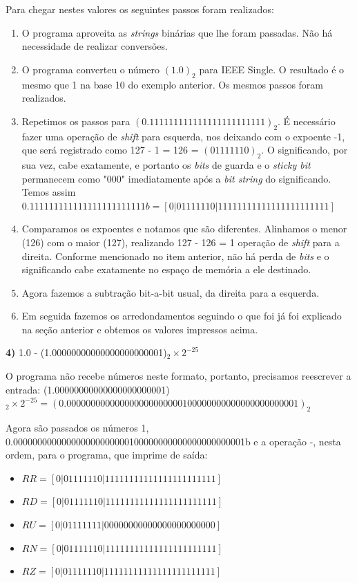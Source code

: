 \documentclass[11pt]{article}
\begin{document}
Para chegar nestes valores os seguintes passos foram realizados:
\begin{enumerate}
  \item O programa aproveita as \textit{strings} binárias que lhe foram passadas. Não há necessidade de realizar conversões.
  \item O programa converteu o número $(1.0)_2$ para IEEE Single. O resultado é o mesmo que 1 na base 10 do exemplo anterior. Os mesmos passos foram realizados.
  \item Repetimos os passos para $(0.111111111111111111111111)_2$. É necessário fazer uma operação de \textit{shift} para esquerda, nos deixando com o expoente -1, que será registrado como 127 - 1 = 126 = $(01111110)_2$.
  O significando, por sua vez, cabe exatamente, e portanto os \textit{bits} de guarda e o \textit{sticky bit} permanecem como "000" imediatamente após a \textit{bit string} do significando. Temos assim
  {\small$0.111111111111111111111111b = [ 0 | 0 1 1 1 1 1 1 0 | 1 1 1 1 1 1 1 1 1 1 1 1 1 1 1 1 1 1 1 1 1 1 1 ] $}
  \item Comparamos os expoentes e notamos que são diferentes. Alinhamos o menor (126) com o maior (127), realizando 127 - 126 = 1 operação de \textit{shift} para a direita. Conforme mencionado no item anterior,
  não há perda de \textit{bits} e o significando cabe exatamente no espaço de memória a ele destinado.
  \item Agora fazemos a subtração bit-a-bit usual, da direita para a esquerda.

  \item Em seguida fazemos os arredondamentos seguindo o que foi já foi explicado na seção anterior e obtemos os valores impressos acima.
\end{enumerate}

\textbf{4)} 1.0 - (1.00000000000000000000001)$_2 \times 2^{-25} $

O programa não recebe números neste formato, portanto, precisamos reescrever a entrada:
(1.00000000000000000000001)$_2 \times 2^{-25} = (0.000000000000000000000000100000000000000000000001)_2 $

Agora são passados os números 1, 0.000000000000000000000000100000000000000000000001b e a operação -, nesta ordem, para o programa, que imprime de saída:

\begin{itemize}
  \item {\small$ RR = [ 0 | 0 1 1 1 1 1 1 0 | 1 1 1 1 1 1 1 1 1 1 1 1 1 1 1 1 1 1 1 1 1 1 1 ] $}
  \item {\small$ RD = [ 0 | 0 1 1 1 1 1 1 0 | 1 1 1 1 1 1 1 1 1 1 1 1 1 1 1 1 1 1 1 1 1 1 1 ] $}
  \item {\small$ RU = [ 0 | 0 1 1 1 1 1 1 1 | 0 0 0 0 0 0 0 0 0 0 0 0 0 0 0 0 0 0 0 0 0 0 0 ] $}
  \item {\small$ RN = [ 0 | 0 1 1 1 1 1 1 0 | 1 1 1 1 1 1 1 1 1 1 1 1 1 1 1 1 1 1 1 1 1 1 1 ] $}
  \item {\small$ RZ = [ 0 | 0 1 1 1 1 1 1 0 | 1 1 1 1 1 1 1 1 1 1 1 1 1 1 1 1 1 1 1 1 1 1 1 ] $}
\end{itemize}
\end{document}
